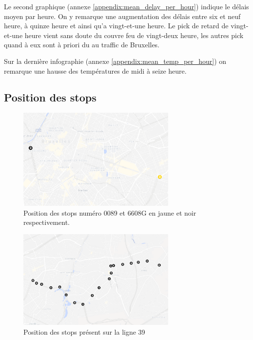 \documentclass[12pt]{report}
\begin{document}
Le second graphique (annexe \ref{appendix:mean_delay_per_hour}) indique le délais moyen par heure. On y remarque une augmentation des délais entre six et neuf heure, à quinze heure et ainsi qu'a vingt-et-une heure. Le pick de retard de vingt-et-une heure vient sans doute du couvre feu de vingt-deux heure, les autres pick quand à eux sont à priori du au traffic de Bruxelles.

Sur la dernière infographie (annexe \ref{appendix:mean_temp_per_hour}) on remarque une hausse des températures de midi à seize heure.

\begin{appendices}
    \chapter{Position des stops}
    \begin{figure}[h]
        \centering
        \includegraphics[width=0.7\textwidth]{images/stop_pos_1.png}
        \caption{Position des stops numéro 0089 et 6608G en jaune et noir respectivement.}
        \label{appendix:stop_pos_1}
    \end{figure}

    \begin{figure}[h]
        \centering
        \includegraphics[width=0.7\textwidth]{images/stop_pos_2.png}
        \caption{Position des stops présent sur la ligne 39}
        \label{appendix:stop_pos_2}
    \end{figure}


\end{appendices}
\end{document}
